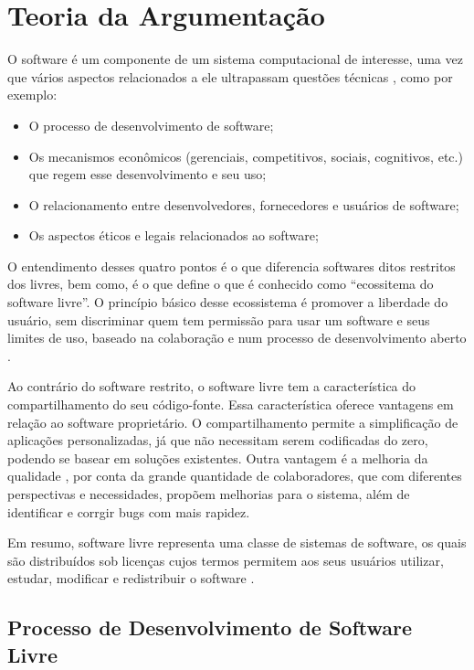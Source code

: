\chapter{Teoria da Argumentação}

O software é um componente de um sistema computacional de interesse, uma vez que vários aspectos relacionados a ele ultrapassam questões técnicas \cite{meirelles2013metrics}, como por exemplo: 

\begin{itemize}
\item O processo de desenvolvimento de software;
\item Os mecanismos econômicos (gerenciais, competitivos, sociais, cognitivos, etc.) que regem esse desenvolvimento e seu uso;
\item O relacionamento entre desenvolvedores, fornecedores e usuários de software;
\item Os aspectos éticos e legais relacionados ao software;
\end{itemize}

O entendimento desses quatro pontos é o que diferencia softwares ditos restritos dos livres, bem como, é o que define o que é conhecido como ``ecossitema do software livre''. O princípio básico desse ecossistema é promover a liberdade do usuário, sem discriminar quem tem permissão para usar um software e seus limites de uso, baseado na colaboração e num processo de desenvolvimento aberto \cite{meirelles2013metrics}.

Ao contrário do software restrito, o software livre tem a característica do compartilhamento do seu código-fonte. Essa característica oferece vantagens em relação ao software proprietário. O compartilhamento permite a simplificação de aplicações personalizadas, já que não necessitam serem codificadas do zero, podendo se basear em soluções existentes. Outra vantagem é a melhoria da qualidade \cite{raymond1999cathedral}, por conta da grande quantidade de colaboradores, que com diferentes perspectivas e necessidades, propõem melhorias para o sistema, além de identificar e corrgir bugs com mais rapidez.

Em resumo, software livre representa uma classe de sistemas de software, os quais são distribuídos sob licenças cujos termos permitem aos seus usuários utilizar, estudar, modificar e redistribuir o software \cite{terceiro2012freesoftware}. 

\section{Processo de Desenvolvimento de Software Livre}
\label{sec-proc-sl}

